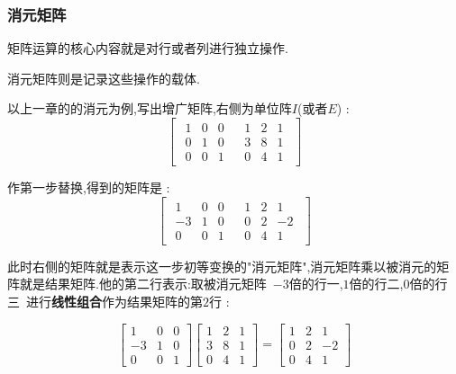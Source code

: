 \documentclass[UTF8,12pt]{ctexbook}
\newcommand{\mediumBigCase}[1]{\left[#1\right]}
\newcommand{\boldText}[1]{{\bfseries#1}}
\newcommand{\augmentedMatrix}[2]{
  \mediumBigCase{
    \begin{array}{c|c}
      #1 & #2
    \end{array}
    }
    }
\begin{document}
{{{{\subsubsection{消元矩阵}{
矩阵运算的核心内容就是对行或者列进行独立操作.

消元矩阵则是记录这些操作的载体.

以上一章的的消元为例,写出增广矩阵,右侧为单位阵$I$(或者$E$) :
$$
  \augmentedMatrix{
    \begin{matrix}
      1 & 0 & 0 \\
      0 & 1 & 0 \\
      0 & 0 & 1
    \end{matrix}
  }{
    \begin{matrix}
      1 & 2 & 1 \\
      3 & 8 & 1 \\
      0 & 4 & 1
    \end{matrix}
  }
$$

作第一步替换,得到的矩阵是 :
$$
  \augmentedMatrix{
    \begin{matrix}
      1  & 0 & 0 \\
      -3 & 1 & 0 \\
      0  & 0 & 1
    \end{matrix}
  }{
    \begin{matrix}
      1 & 2 & 1  \\
      0 & 2 & -2 \\
      0 & 4 & 1
    \end{matrix}
  }
$$

此时右侧的矩阵就是表示这一步初等变换的"消元矩阵",消元矩阵乘以被消元的矩阵就是结果矩阵.他的第二行表示:取被消元矩阵\ $-3$倍的行一,$1$倍的行二,$0$倍的行三\ 进行\boldText{线性组合}作为结果矩阵的第$2$行 :

$$
  \begin{bmatrix}
    1  & 0 & 0 \\
    -3 & 1 & 0 \\
    0  & 0 & 1
  \end{bmatrix}
  \begin{bmatrix}
    1 & 2 & 1 \\
    3 & 8 & 1 \\
    0 & 4 & 1
  \end{bmatrix}
  =
  \begin{bmatrix}
    1 & 2 & 1  \\
    0 & 2 & -2 \\
    0 & 4 & 1
  \end{bmatrix}
$$

}}}}}
\end{document}
